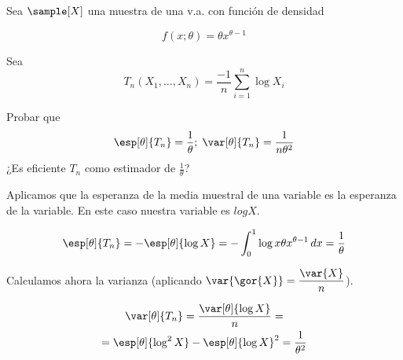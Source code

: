 \begin{problem}[9]
Sea $\sample[X]$ una muestra de una v.a. con función de densidad 

\[ f(x;\theta) = \theta x^{\theta - 1} \]

Sea  \[ T_n(X_1,\dotsc,X_n) = \frac{-1}{n}\sum_{i=1}^n\log X_i \]

\ppart Probar que \[\esp[\theta]{T_n} = \frac{1}{\theta};\; \var[\theta]{T_n} = \frac{1}{n\theta^2} \]
\ppart ¿Es eficiente $T_n$ como estimador de $\frac{1}{\theta}$?

\solution

\spart
Aplicamos que la esperanza de la media muestral de una variable es la esperanza de la variable. En este caso nuestra variable es $log X$.

\[ \esp[\theta]{T_n} = -\esp[\theta]{\log X} = - \int_0^1 \log x \theta x ^{\theta-1}\,dx = \frac{1}{\theta} \]

Calculamos ahora la varianza (aplicando $\displaystyle \var{\gor{X}} = \frac{\var{X}}{n}$).

\begin{gather*}
\var[\theta]{T_n} = \frac{\var[\theta]{\log X}}{n} = \\
= \esp[\theta]{\log^2 X} - \esp[\theta]{\log X}^2 = \frac{1}{\theta^2}
\end{gather*}

\end{problem}



